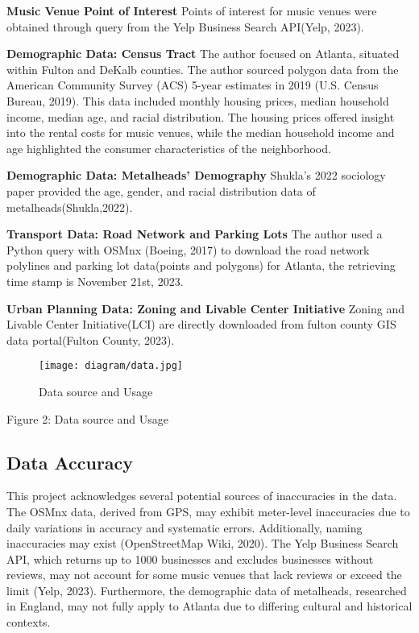 \documentclass[11pt]{article}
\begin{document}
\textbf{Music Venue Point of Interest}
Points of interest for music venues were obtained through query from the Yelp Business Search API(Yelp, 2023). 

\textbf{Demographic Data: Census Tract} The author focused on Atlanta, situated within Fulton and DeKalb counties. The author sourced polygon data from the American Community Survey (ACS) 5-year estimates in 2019 (U.S. Census Bureau, 2019). This data included monthly housing prices, median household income, median age, and racial distribution. The housing prices offered insight into the rental costs for music venues, while the median household income and age highlighted the consumer characteristics of the neighborhood.

\textbf{Demographic Data: Metalheads’ Demography} 
Shukla’s 2022 sociology paper provided the age, gender, and racial distribution data of metalheads(Shukla,2022).

\textbf{Transport Data: Road Network and Parking Lots} 
The author used a Python query with OSMnx (Boeing, 2017) to download the road network polylines and parking lot data(points and polygons) for Atlanta, the retrieving time stamp is November 21st, 2023.

\textbf{Urban Planning Data: Zoning and Livable Center Initiative}
Zoning and Livable Center Initiative(LCI) are directly downloaded from fulton county GIS data portal(Fulton County, 2023).

\begin{figure}[H]
\begin{center}
\centering
\texttt{[image: diagram/data.jpg]}
\caption{Data source and Usage}
\label{fig:figure1}
\end{center}
\end{figure}

\begin{center}
\centering
Figure 2: Data source and Usage
\end{center}


\subsection{Data Accuracy}

This project acknowledges several potential sources of inaccuracies in the data. The OSMnx data, derived from GPS, may exhibit meter-level inaccuracies due to daily variations in accuracy and systematic errors. Additionally, naming inaccuracies may exist (OpenStreetMap Wiki, 2020). The Yelp Business Search API, which returns up to 1000 businesses and excludes businesses without reviews, may not account for some music venues that lack reviews or exceed the limit (Yelp, 2023). Furthermore, the demographic data of metalheads, researched in England, may not fully apply to Atlanta due to differing cultural and historical contexts.
\end{document}
